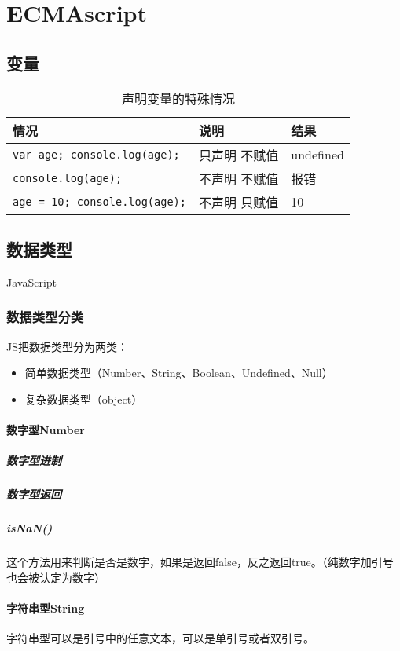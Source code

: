 \chapter{ECMAscript}
\section{变量}
\begin{table}
\caption{声明变量的特殊情况}
\centering
\begin{tabular}{lll}
\hline
情况&说明&结果\\
\hline
\verb|var age; console.log(age);|&只声明 不赋值&undefined\\
\verb|console.log(age);|&不声明 不赋值&报错\\
\verb|age = 10; console.log(age);|&不声明 只赋值&10\\
\hline
\end{tabular}
\end{table}
\section{数据类型}
JavaScript
\subsection{数据类型分类}
JS把数据类型分为两类：
\begin{itemize}
	\item 简单数据类型（Number、String、Boolean、Undefined、Null）
	\item 复杂数据类型（object）
\end{itemize}
\subsubsection{数字型Number}
\paragraph{数字型进制}
\paragraph{数字型返回}

\paragraph{isNaN()}
这个方法用来判断是否是数字，如果是返回false，反之返回true。（纯数字加引号也会被认定为数字）
\subsubsection{字符串型String}
字符串型可以是引号中的任意文本，可以是单引号或者双引号。

